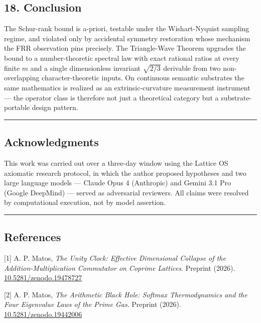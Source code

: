 \documentclass[
  11pt,
]{article}
\begin{document}
\subsection{18. Conclusion}\label{conclusion}

The Schur-rank bound is a-priori, testable under the Wishart-Nyquist
sampling regime, and violated only by accidental symmetry restoration
whose mechanism the FRR observation pins precisely. The Triangle-Wave
Theorem upgrades the bound to a number-theoretic spectral law with exact
rational ratios at every finite \(m\) and a single dimensionless
invariant \(\sqrt{2/3}\) derivable from two non-overlapping
character-theoretic inputs. On continuous semantic substrates the same
mathematics is realized as an extrinsic-curvature measurement instrument
--- the operator class is therefore not just a theoretical category but
a substrate-portable design pattern.

\begin{center}\rule{0.5\linewidth}{0.5pt}\end{center}

\subsection{Acknowledgments}\label{acknowledgments}

This work was carried out over a three-day window using the Lattice OS
axiomatic research protocol, in which the author proposed hypotheses and
two large language models --- Claude Opus 4 (Anthropic) and Gemini 3.1
Pro (Google DeepMind) --- served as adversarial reviewers. All claims
were resolved by computational execution, not by model assertion.

\begin{center}\rule{0.5\linewidth}{0.5pt}\end{center}

\subsection{References}\label{references}

{[}1{]} A. P. Matos, \emph{The Unity Clock: Effective Dimensional
Collapse of the Addition-Multiplication Commutator on Coprime Lattices}.
Preprint (2026).
\href{https://doi.org/10.5281/zenodo.19478727}{10.5281/zenodo.19478727}

{[}2{]} A. P. Matos, \emph{The Arithmetic Black Hole: Softmax
Thermodynamics and the Four Eigenvalue Laws of the Prime Gas}. Preprint
(2026).
\href{https://doi.org/10.5281/zenodo.19442006}{10.5281/zenodo.19442006}
\end{document}
